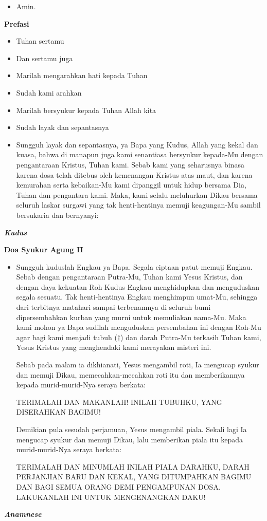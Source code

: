 \documentclass[a5paper,headsepline,titlepage,10pt,normalheadings,DIVcalc]{scrbook}
\makeatletter
\newcommand{\subjudul}[1]{%
  {\parindent \z@ \normalfont
    \interlinepenalty\@M \bfseries #1\par\nobreak \vskip 20\p@ }}
\newcommand{\lagu}[1]{%
  {\parindent \z@ \normalfont
    \interlinepenalty\@M \bfseries \emph{#1}\par\nobreak \vskip 20\p@ }}
\newcommand{\BU}[1]{\begin{itemize} \item[U:] #1 \end{itemize}}
\newcommand{\BI}[1]{\begin{itemize} \item[I:] #1 \end{itemize}}
\makeatother
\begin{document}
\BU{Amin.}

\subjudul{Prefasi}

\BI{Tuhan sertamu}
\BU{Dan sertamu juga}
\BI{Marilah mengarahkan hati kepada Tuhan}
\BU{Sudah kami arahkan}
\BI{Marilah bersyukur kepada Tuhan Allah kita}
\BU{Sudah layak dan sepantasnya}
\BI{Sungguh layak dan sepantasnya, ya Bapa yang Kudus, Allah yang kekal dan kuasa, bahwa di manapun juga kami senantiasa bersyukur kepada-Mu dengan pengantaraan Kristus, Tuhan kami. Sebab kami yang seharusnya binasa karena dosa telah ditebus oleh kemenangan Kristus atas maut, dan karena kemurahan serta kebaikan-Mu kami dipanggil untuk hidup bersama Dia, Tuhan dan pengantara kami. Maka, kami selalu meluhurkan Dikau bersama seluruh laskar surgawi yang tak henti-hentinya memuji keagungan-Mu sambil bersukaria dan bernyanyi:}

\lagu{Kudus}

\subjudul{Doa Syukur Agung II}

\BI{Sungguh kuduslah Engkau ya Bapa. Segala ciptaan patut memuji Engkau. Sebab dengan pengantaraan Putra-Mu, Tuhan kami Yesus Kristus, dan dengan daya kekuatan Roh Kudus Engkau menghidupkan dan menguduskan segala sesuatu. Tak henti-hentinya Engkau menghimpun umat-Mu, sehingga dari terbitnya matahari sampai terbenamnya di seluruh bumi dipersembahkan kurban yang murni untuk memuliakan nama-Mu. Maka kami mohon ya Bapa sudilah menguduskan persembahan ini dengan Roh-Mu agar bagi kami menjadi tubuh ($\dagger$) dan darah Putra-Mu terkasih Tuhan kami, Yesus Kristus yang menghendaki kami merayakan misteri ini.

Sebab pada malam ia dikhianati, Yesus mengambil roti, Ia mengucap syukur dan memuji Dikau, memecahkan-mecahkan roti itu dan memberikannya kepada murid-murid-Nya seraya berkata:

TERIMALAH DAN MAKANLAH! INILAH TUBUHKU, YANG DISERAHKAN BAGIMU!

Demikian pula sesudah perjamuan, Yesus mengambil piala. Sekali lagi Ia mengucap syukur dan memuji Dikau, lalu memberikan piala itu kepada murid-murid-Nya seraya berkata:

TERIMALAH DAN MINUMLAH INILAH PIALA DARAHKU, DARAH PERJANJIAN BARU DAN KEKAL, YANG DITUMPAHKAN BAGIMU DAN BAGI SEMUA ORANG DEMI PENGAMPUNAN DOSA. LAKUKANLAH INI UNTUK MENGENANGKAN DAKU!}

\lagu{Anamnese}
\end{document}
